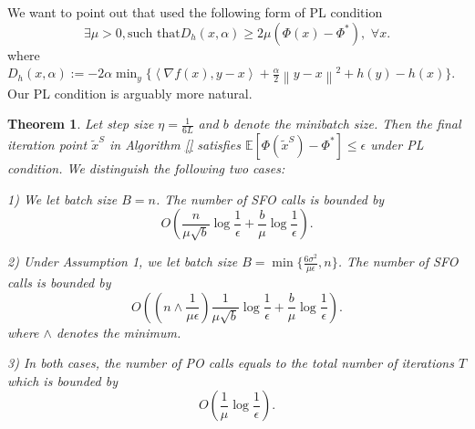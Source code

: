 \documentclass{article}
\newcommand*{\E}{\mathbb{E}}
\newcommand{\norm}[1]{\left\lVert#1\right\rVert}
\newcommand{\Iprod}[2]{\left\langle #1,#2\right\rangle}
\newtheorem{theorem}{Theorem}[section]
\theoremstyle{definition}
\theoremstyle{remark}
\begin{document}
We want to point out that \cite{} used the following form of PL condition
 \begin{equation}
\exists \mu >0, \text{such~that} D_h(x,\alpha) \geq 2\mu (\Phi(x) - \Phi^*),\,\, \forall x.
\end{equation} 
where $D_h(x,\alpha) := -2\alpha \min_y\{\Iprod{\nabla f(x)}{y-x} + \frac{\alpha}{2}\norm{y-x}^2+h(y)-h(x)\}$. Our PL condition is arguably more natural.
\begin{theorem}
Let step size $\eta = \frac{1}{6L}$ and $b$ denote the minibatch size. Then the final iteration point $\tilde{x}^S$ in Algorithm \ref{} satisfies $\E[\Phi(\tilde{x}^S) - \Phi^*]\leq \epsilon$ under PL condition. We distinguish the following two cases:

1) We let batch size $B = n$. The number of SFO calls is bounded by
\[
O\left(\frac{n}{\mu \sqrt{b}}\log \frac{1}{\epsilon}+\frac{b}{\mu}\log\frac{1}{\epsilon}\right).
\]

2) Under Assumption 1, we let batch size $B = \min\{\frac{6\sigma^2}{\mu\epsilon},n\}$. The number of SFO calls is bounded by
\[
O\left((n\wedge\frac{1}{\mu \epsilon})\frac{1}{\mu \sqrt{b}}\log \frac{1}{\epsilon}+\frac{b}{\mu}\log\frac{1}{\epsilon}\right).
\]
where $\wedge$ denotes the minimum.

3) In both cases, the number of PO calls equals to the total number of iterations $T$ which is bounded by
\[
O\left(\frac{1}{\mu}\log\frac{1}{\epsilon}\right).
\]
\end{theorem}
\end{document}
